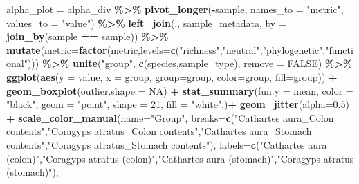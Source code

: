 \documentclass[
]{book}
\newenvironment{Shaded}{\begin{snugshade}}{\end{snugshade}}
\newcommand{\AttributeTok}[1]{\textcolor[rgb]{0.13,0.29,0.53}{#1}}
\newcommand{\ConstantTok}[1]{\textcolor[rgb]{0.56,0.35,0.01}{#1}}
\newcommand{\DecValTok}[1]{\textcolor[rgb]{0.00,0.00,0.81}{#1}}
\newcommand{\FloatTok}[1]{\textcolor[rgb]{0.00,0.00,0.81}{#1}}
\newcommand{\FunctionTok}[1]{\textcolor[rgb]{0.13,0.29,0.53}{\textbf{#1}}}
\newcommand{\NormalTok}[1]{#1}
\newcommand{\OtherTok}[1]{\textcolor[rgb]{0.56,0.35,0.01}{#1}}
\newcommand{\SpecialCharTok}[1]{\textcolor[rgb]{0.81,0.36,0.00}{\textbf{#1}}}
\newcommand{\StringTok}[1]{\textcolor[rgb]{0.31,0.60,0.02}{#1}}
\begin{document}
\begin{Shaded}
\begin{Highlighting}[]
\NormalTok{alpha\_plot }\OtherTok{=}\NormalTok{ alpha\_div }\SpecialCharTok{\%\textgreater{}\%}
  \FunctionTok{pivot\_longer}\NormalTok{(}\SpecialCharTok{{-}}\NormalTok{sample, }\AttributeTok{names\_to =} \StringTok{"metric"}\NormalTok{, }\AttributeTok{values\_to =} \StringTok{"value"}\NormalTok{) }\SpecialCharTok{\%\textgreater{}\%}
  \FunctionTok{left\_join}\NormalTok{(., sample\_metadata, }\AttributeTok{by =} \FunctionTok{join\_by}\NormalTok{(sample }\SpecialCharTok{==}\NormalTok{ sample)) }\SpecialCharTok{\%\textgreater{}\%}
  \FunctionTok{mutate}\NormalTok{(}\AttributeTok{metric=}\FunctionTok{factor}\NormalTok{(metric,}\AttributeTok{levels=}\FunctionTok{c}\NormalTok{(}\StringTok{"richness"}\NormalTok{,}\StringTok{"neutral"}\NormalTok{,}\StringTok{"phylogenetic"}\NormalTok{,}\StringTok{"functional"}\NormalTok{))) }\SpecialCharTok{\%\textgreater{}\%}
  \FunctionTok{unite}\NormalTok{(}\StringTok{"group"}\NormalTok{, }\FunctionTok{c}\NormalTok{(species,sample\_type), }\AttributeTok{remove =} \ConstantTok{FALSE}\NormalTok{) }\SpecialCharTok{\%\textgreater{}\%}
      \FunctionTok{ggplot}\NormalTok{(}\FunctionTok{aes}\NormalTok{(}\AttributeTok{y =}\NormalTok{ value, }\AttributeTok{x =}\NormalTok{ group, }\AttributeTok{group=}\NormalTok{group, }\AttributeTok{color=}\NormalTok{group, }\AttributeTok{fill=}\NormalTok{group)) }\SpecialCharTok{+}
      \FunctionTok{geom\_boxplot}\NormalTok{(}\AttributeTok{outlier.shape =} \ConstantTok{NA}\NormalTok{) }\SpecialCharTok{+}
  \FunctionTok{stat\_summary}\NormalTok{(}\AttributeTok{fun.y =}\NormalTok{ mean, }\AttributeTok{color =} \StringTok{"black"}\NormalTok{, }\AttributeTok{geom =} \StringTok{"point"}\NormalTok{, }\AttributeTok{shape =} \DecValTok{21}\NormalTok{, }\AttributeTok{fill =} \StringTok{"white"}\NormalTok{,)}\SpecialCharTok{+}
      \FunctionTok{geom\_jitter}\NormalTok{(}\AttributeTok{alpha=}\FloatTok{0.5}\NormalTok{) }\SpecialCharTok{+}
      \FunctionTok{scale\_color\_manual}\NormalTok{(}\AttributeTok{name=}\StringTok{"Group"}\NormalTok{,}
          \AttributeTok{breaks=}\FunctionTok{c}\NormalTok{(}\StringTok{"Cathartes aura\_Colon contents"}\NormalTok{,}\StringTok{"Coragyps atratus\_Colon contents"}\NormalTok{,}\StringTok{"Cathartes aura\_Stomach contents"}\NormalTok{,}\StringTok{"Coragyps atratus\_Stomach contents"}\NormalTok{),}
          \AttributeTok{labels=}\FunctionTok{c}\NormalTok{(}\StringTok{"Cathartes aura (colon)"}\NormalTok{,}\StringTok{"Coragyps atratus (colon)"}\NormalTok{,}\StringTok{"Cathartes aura (stomach)"}\NormalTok{,}\StringTok{"Coragyps atratus (stomach)"}\NormalTok{),}

\end{Highlighting}
\end{Shaded}
\end{document}
